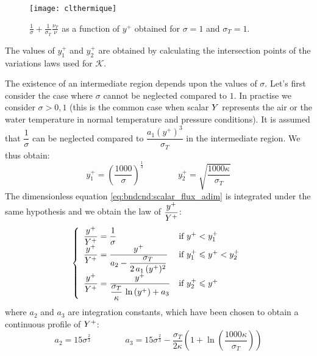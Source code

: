 \begin{figure}[!htp]
\centering
\texttt{[image: clthermique]}
\caption{$\frac{1}{\sigma} + \frac{1}{\sigma_T}\frac{\nu_T}{\nu} $ as a function of $y^+$ obtained
 for $\sigma=1$ and $\sigma_T=1$. \label{fig:bndcnd:3layer_temperature_wall_function}}
\end{figure}

The values of $y^+_1$ and $y^+_2$ are obtained by calculating
the intersection points of the variations laws used
for $\mathcal{K}$.

The existence of an intermediate region depends upon the
values of $\sigma$.
Let's first consider the case where $\sigma$ cannot be neglected
compared to $1$. In practise we consider  $\sigma > 0,1$
(this is the common case when scalar $Y$ represents
the air or the water temperature in normal temperature
and pressure conditions). It is assumed that
$\displaystyle\dfrac{1}{\sigma}$ can be neglected compared to
$\displaystyle\dfrac{a_1 (y^+)^3}{\sigma_T}$ in the
intermediate region.
We thus obtain:
\begin{equation}
  y^+_1 =\left(\displaystyle\frac{1000}{\sigma}\right)^\frac{1}{3} \qquad\qquad
  y^+_2 = \sqrt{\displaystyle\frac{1000\kappa}{\sigma_T}}
\end{equation}
The dimensionless equation \eqref{eq:bndcnd:scalar_flux_adim}
is integrated under the same hypothesis and we obtain the law of $\dfrac{y^+}{Y^+}$:
\begin{equation}\label{eq:bndcnd:wallfunctions_t_3layers}
\left\{
\begin{array}{ll}
\dfrac{y^+}{Y^+} = \dfrac{1}{\sigma} & \text{if } y^+ < y^+_1 \\
\dfrac{y^+}{Y^+} = \dfrac{y^+}{a_2 -\displaystyle\frac{\sigma_T}{2\,a_1\,(y^+)^2}}& \text{if } y_1^+ \leqslant y^+ < y_2^+ \\
\dfrac{y^+}{Y^+} = \dfrac{y^+}{\dfrac{\sigma_T}{\kappa}\,\ln \left(y^+ \right)+a_3} & \text{if } y^+_2 \leqslant y^+
\end{array}
\right.
\end{equation}
where $a_2$ and $a_3$ are integration constants,
which have been chosen to obtain
a continuous  profile of $Y^+$:
\begin{equation}
a_2=15\sigma^{\frac{2}{3}}\qquad\qquad
a_3=15\sigma^{\frac{2}{3}}-\displaystyle\frac{\sigma_T}{2\kappa}
\left(1+
\ln \left(\displaystyle\frac{1000\kappa}{\sigma_T}\right)\right)
\end{equation}

